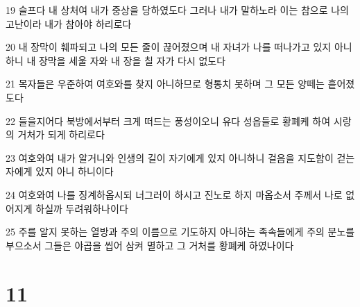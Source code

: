 \par 19 슬프다 내 상처여 내가 중상을 당하였도다 그러나 내가 말하노라 이는 참으로 나의 고난이라 내가 참아야 하리로다
\par 20 내 장막이 훼파되고 나의 모든 줄이 끊어졌으며 내 자녀가 나를 떠나가고 있지 아니하니 내 장막을 세울 자와 내 장을 칠 자가 다시 없도다
\par 21 목자들은 우준하여 여호와를 찾지 아니하므로 형통치 못하며 그 모든 양떼는 흩어졌도다
\par 22 들을지어다 북방에서부터 크게 떠드는 풍성이오니 유다 성읍들로 황폐케 하여 시랑의 거처가 되게 하리로다
\par 23 여호와여 내가 알거니와 인생의 길이 자기에게 있지 아니하니 걸음을 지도함이 걷는 자에게 있지 아니 하니이다
\par 24 여호와여 나를 징계하옵시되 너그러이 하시고 진노로 하지 마옵소서 주께서 나로 없어지게 하실까 두려워하나이다
\par 25 주를 알지 못하는 열방과 주의 이름으로 기도하지 아니하는 족속들에게 주의 분노를 부으소서 그들은 야곱을 씹어 삼켜 멸하고 그 거처를 황폐케 하였나이다

\chapter{11}

